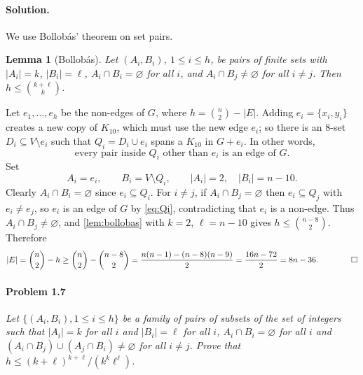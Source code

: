 \documentclass[a4paper,12pt]{article}
\newcommand{\card}[1]{\left| #1 \right|}
\theoremstyle{definition}
\theoremstyle{plain}
\newtheorem{lemma}{Lemma}
\begin{document}
\paragraph{Solution.} We use Bollob\'as' theorem on set pairs.

\begin{lemma}[Bollob\'as]\label{lem:bollobas}
	Let $(A_i, B_i)$, $1 \le i \le h$, be pairs of finite sets with $\card{A_i} = k$, $\card{B_i} = \ell$, $A_i \cap B_i = \varnothing$ for all $i$, and $A_i \cap B_j \neq \varnothing$ for all $i \neq j$. Then $h \le \binom{k+\ell}{k}$.
\end{lemma}

Let $e_1, \dots, e_h$ be the non-edges of $G$, where $h = \binom n2 - \card E$. Adding $e_i = \{x_i, y_i\}$ creates a new copy of $K_{10}$, which must use the new edge $e_i$; so there is an $8$-set $D_i \subseteq V \setminus e_i$ such that $Q_i = D_i \cup e_i$ spans a $K_{10}$ in $G + e_i$. In other words,
\begin{equation}\label{eq:Qi}
	\text{every pair inside } Q_i \text{ other than } e_i \text{ is an edge of } G .
\end{equation}
Set
\[
	A_i = e_i, \qquad B_i = V \setminus Q_i, \qquad \card{A_i} = 2, \quad \card{B_i} = n - 10 .
\]
Clearly $A_i \cap B_i = \varnothing$ since $e_i \subseteq Q_i$. For $i \ne j$, if $A_i \cap B_j = \varnothing$ then $e_i \subseteq Q_j$ with $e_i \ne e_j$, so $e_i$ is an edge of $G$ by \eqref{eq:Qi}, contradicting that $e_i$ is a non-edge. Thus $A_i \cap B_j \ne \varnothing$, and \autoref{lem:bollobas} with $k = 2$, $\ell = n-10$ gives $h \le \binom{n-8}{2}$. Therefore
\[
	\card E = \binom n2 - h \ge \binom n2 - \binom{n-8}{2} = \frac{n(n-1) - (n-8)(n-9)}{2} = \frac{16n - 72}{2} = 8n - 36. \qquad \qed
\]

\paragraph{Problem 1.7} \emph{Let $\{(A_i, B_i), 1 \le i \le h\}$ be a family of pairs of subsets of the set of integers such that $\card{A_i} = k$ for all $i$ and $\card{B_i} = \ell$ for all $i$, $A_i \cap B_i = \varnothing$ for all $i$ and $(A_i \cap B_j) \cup (A_j \cap B_i) \ne \varnothing$ for all $i \ne j$. Prove that $h \le (k+\ell)^{k+\ell} / (k^k \ell^\ell)$.}
\end{document}
